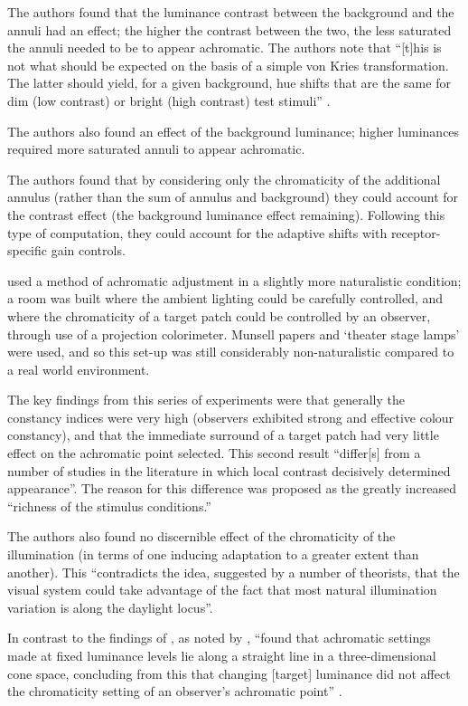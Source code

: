 The authors found that the luminance contrast between the background and the annuli had an effect; the higher the contrast between the two, the less saturated the annuli needed to be to appear achromatic. The authors note that ``[t]his is not what should be expected on the basis of a simple von Kries transformation. The latter should yield, for a given background, hue shifts that are the same for dim (low contrast) or bright (high contrast) test stimuli'' \citep{walraven_chromatic_1982}.

The authors also found an effect of the background luminance; higher luminances required more saturated annuli to appear achromatic. 

The authors found that by considering only the chromaticity of the additional annulus (rather than the sum of annulus and background) they could account for the contrast effect (the background luminance effect remaining). Following this type of computation, they could account for the adaptive shifts with receptor-specific gain controls.

\textbf{\citet{brainard_color_1998}} used a method of achromatic adjustment in a slightly more naturalistic condition; a room was built where the ambient lighting could be carefully controlled, and where the chromaticity of a target patch could be controlled by an observer, through use of a projection colorimeter. Munsell papers and `theater stage lamps' were used, and so this set-up was still considerably non-naturalistic compared to a real world environment.

The key findings from this series of experiments were that generally the constancy indices were very high (observers exhibited strong and effective colour constancy), and that the immediate surround of a target patch had very little effect on the achromatic point selected. This second result ``differ[s] from a number of studies in the literature in which local contrast decisively determined appearance''. The reason for this difference was proposed as the greatly increased ``richness of the stimulus conditions.''

The authors also found no discernible effect of the chromaticity of the illumination (in terms of one inducing adaptation to a greater extent than another). This ``contradicts the idea, suggested by a number of theorists, that the visual system could take advantage of the fact that most natural illumination variation is along the daylight locus''.

In contrast to the findings of \citet{werner_effect_1982}, as noted by \citet{aston_what_2017}, \citet{brainard_color_1998} ``found that achromatic settings made at fixed luminance levels lie along a straight line in a three-dimensional cone space, concluding from this that changing [target] luminance did not affect the chromaticity setting of an observer’s achromatic point'' \citep{aston_what_2017}.


